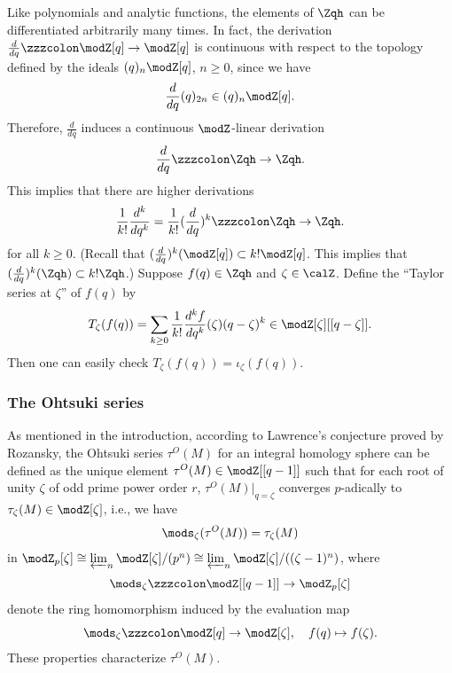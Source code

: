 \documentclass{amsart}
\numberwithin{equation}{section}
\numberwithin{figure}{section}
\theoremstyle{plain}
\theoremstyle{definition}
\theoremstyle{remark}
\begin{document}
Like polynomials and analytic functions, the elements of $\Zqh$ can be
differentiated arbitrarily many times.  In fact, the derivation
$\frac{d}{dq}\zzzcolon \modZ [q]\rightarrow \modZ [q]$ is continuous with respect to the
topology defined by the ideals $(q)_n\modZ [q]$, $n\ge 0$, since we have
\begin{equation}
  \frac{d}{dq}(q)_{2n}\in (q)_n\modZ [q].
\end{equation}
Therefore, $\frac d{dq}$ induces a continuous $\modZ $-linear derivation
\begin{equation}
  \frac{d}{dq}\zzzcolon \Zqh\rightarrow \Zqh.
\end{equation}
This implies that there are higher derivations
\begin{equation*}
  \frac{1}{k!}\frac{d^k}{dq^k}=\frac{1}{k!}
  (\frac{d}{dq})^k\zzzcolon \Zqh\rightarrow \Zqh.
\end{equation*}
for all $k\ge 0$.  (Recall that $(\frac{d}{dq})^k(\modZ [q])\subset k!\modZ [q]$.
This implies that $(\frac{d}{dq})^k(\Zqh)\subset k!\Zqh$.)
Suppose $f(q)\in \Zqh$ and $\zeta \in \calZ$.  Define the ``Taylor series at
$\zeta $'' of $f(q)$ by
\begin{equation*}
  T_\zeta (f(q))=\sum_{k\ge 0}\frac{1}{k!}\frac{d^kf}{dq^k}(\zeta )(q-\zeta )^k
  \in \modZ [\zeta ][[q-\zeta ]].
\end{equation*}
Then one can easily check $T_\zeta (f(q))=\iota _\zeta (f(q))$.

\subsubsection{The Ohtsuki series}
\label{sec:ohtsuki-series}
As mentioned in the introduction, according to Lawrence's conjecture
proved by Rozansky, the Ohtsuki series $\tau ^O(M)$ for an integral
homology sphere can be defined as the unique element
$\tau ^O(M)\in \modZ [[q-1]]$ such that for each root of unity $\zeta $ of odd
prime power order $r$, $\tau ^O(M)|_{q=\zeta }$ converges $p$-adically to
$\tau _\zeta (M)\in \modZ [\zeta ]$, i.e., we have
\begin{equation}
  \label{e59}
  \mods _\zeta (\tau ^O(M))=\tau _\zeta (M)
\end{equation}
in $\modZ _p[\zeta ]\cong\varprojlim_n\modZ [\zeta ]/(p^n)\cong\varprojlim_n\modZ [\zeta ]/((\zeta -1)^n)$,
where
\begin{equation*}
  \mods _\zeta \zzzcolon \modZ [[q-1]]\rightarrow \modZ _p[\zeta ]
\end{equation*}
denote the ring homomorphism induced by the evaluation map
\begin{equation*}
  \mods _\zeta \zzzcolon \modZ [q]\rightarrow \modZ [\zeta ],\quad  f(q)\mapsto f(\zeta ).
\end{equation*}
These properties characterize $\tau ^O(M)$.
\end{document}
